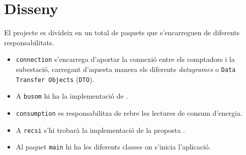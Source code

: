 \section{Disseny}
El projecte es divideix en un total de  paquets que s'encarreguen de diferents responsabilitats.
\begin{itemize}
	\item \texttt{connection} s'encarrega d'aportar la connexió entre els comptadors i la subestació, carregant d'aquesta manera els diferents \textit{datagrames} o  \texttt{Data Transfer Objects} (\texttt{DTO}).
	\item A \texttt{busom} hi ha la implementació de \cite{busom}.
	\item \texttt{consumption} es responsabilitza de rebre les lectures de consum d'energia.
	\item A \texttt{recsi} s'hi trobarà la implementació de la proposta \cite{recsi}.
	\item Al paquet \texttt{main} hi ha les diferents classes on s'inicia l'aplicació. \label{list:packages}
\end{itemize}
